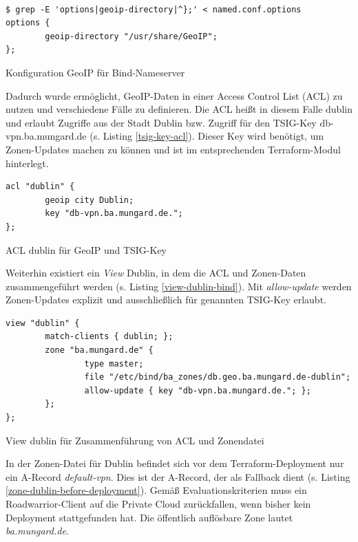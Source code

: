 \begin{listing}[h]
\begin{verbatim}

$ grep -E 'options|geoip-directory|^};' < named.conf.options
options {
        geoip-directory "/usr/share/GeoIP";
};

\end{verbatim}
\caption{Konfiguration GeoIP für Bind-Nameserver}
\label{bind-geoip-directory}
\end{listing}\FloatBarrier
Dadurch wurde ermöglicht, \gls{GeoIP}-Daten in einer Access Control List (\gls{ACL}) zu nutzen und verschiedene Fälle zu definieren. Die \gls{ACL} heißt in diesem Falle \glqq dublin\grqq{} und erlaubt Zugriffe aus der Stadt Dublin bzw. Zugriff für den \gls{TSIG}-Key \glqq db-vpn.ba.mungard.de\grqq{} (s. Listing \ref{tsig-key-acl}). Dieser Key wird benötigt, um \gls{Zone}n-Updates machen zu können und ist im entsprechenden Terraform-Modul hinterlegt.
\begin{listing}[h]
\begin{verbatim}
acl "dublin" {
        geoip city Dublin;
        key "db-vpn.ba.mungard.de.";
};
\end{verbatim}
\caption{ACL \glqq dublin\grqq{} für GeoIP und TSIG-Key}
\label{tsig-key-acl}
\end{listing}\FloatBarrier
Weiterhin existiert ein \textit{\gls{View}} \glqq Dublin\grqq{}, in dem die \gls{ACL} und \gls{Zone}n-Daten zusammengeführt werden (s. Listing \ref{view-dublin-bind}). Mit \textit{allow-update} werden \gls{Zone}n-Updates explizit und ausschließlich für genannten \gls{TSIG}-Key erlaubt.
\begin{listing}[h]
\begin{verbatim}
view "dublin" {
        match-clients { dublin; };
        zone "ba.mungard.de" {
                type master;
                file "/etc/bind/ba_zones/db.geo.ba.mungard.de-dublin";
                allow-update { key "db-vpn.ba.mungard.de."; };
        };
};
\end{verbatim}
\caption{View \glqq dublin\grqq{} für Zusammenführung von ACL und Zonendatei}
\label{view-dublin-bind}
\end{listing}\FloatBarrier
In der \gls{Zone}n-Datei für Dublin befindet sich vor dem Terraform-\gls{Deployment} nur ein A-Record \textit{default-vpn}. Dies ist der A-Record, der als \gls{Fallback} dient (s. Listing \ref{zone-dublin-before-deployment}). Gemäß Evaluationskriterien muss ein \gls{Roadwarrior}-\gls{Client} auf die Private Cloud zurückfallen, wenn bisher kein \gls{Deployment} stattgefunden hat. Die öffentlich auflösbare \gls{Zone} lautet \textit{ba.mungard.de}.
